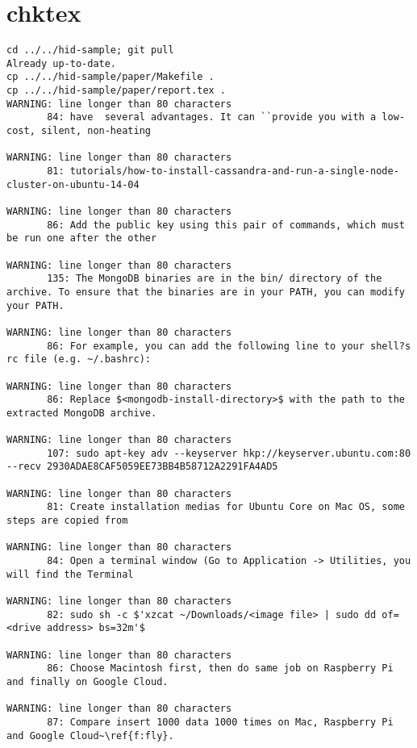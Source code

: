 \appendix
\section{chktex}
\begin{tiny}
\begin{verbatim}
cd ../../hid-sample; git pull
Already up-to-date.
cp ../../hid-sample/paper/Makefile .
cp ../../hid-sample/paper/report.tex .
WARNING: line longer than 80 characters
       84: have  several advantages. It can ``provide you with a low-cost, silent, non-heating

WARNING: line longer than 80 characters
       81: tutorials/how-to-install-cassandra-and-run-a-single-node-cluster-on-ubuntu-14-04

WARNING: line longer than 80 characters
       86: Add the public key using this pair of commands, which must be run one after the other

WARNING: line longer than 80 characters
       135: The MongoDB binaries are in the bin/ directory of the archive. To ensure that the binaries are in your PATH, you can modify your PATH.

WARNING: line longer than 80 characters
       86: For example, you can add the following line to your shell?s rc file (e.g. ~/.bashrc):

WARNING: line longer than 80 characters
       86: Replace $<mongodb-install-directory>$ with the path to the extracted MongoDB archive.

WARNING: line longer than 80 characters
       107: sudo apt-key adv --keyserver hkp://keyserver.ubuntu.com:80 --recv 2930ADAE8CAF5059EE73BB4B58712A2291FA4AD5

WARNING: line longer than 80 characters
       81: Create installation medias for Ubuntu Core on Mac OS, some steps are copied from

WARNING: line longer than 80 characters
       84: Open a terminal window (Go to Application -> Utilities, you will find the Terminal 

WARNING: line longer than 80 characters
       82: sudo sh -c $'xzcat ~/Downloads/<image file> | sudo dd of=<drive address> bs=32m'$

WARNING: line longer than 80 characters
       86: Choose Macintosh first, then do same job on Raspberry Pi and finally on Google Cloud.

WARNING: line longer than 80 characters
       87: Compare insert 1000 data 1000 times on Mac, Raspberry Pi and Google Cloud~\ref{f:fly}.


\end{verbatim}
\end{tiny}
